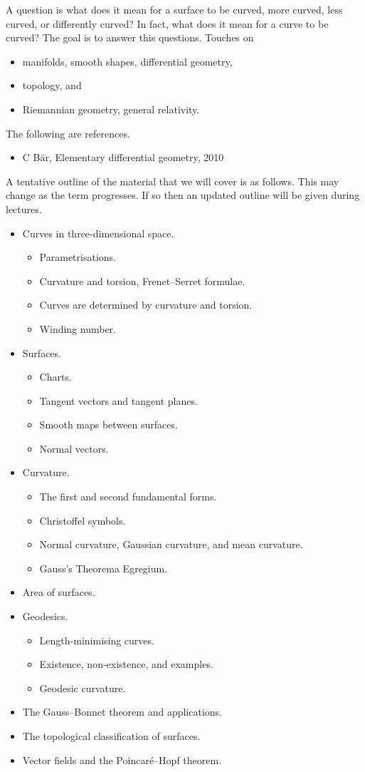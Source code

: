 A question is what does it mean for a surface to be curved, more curved, less curved, or differently curved? In fact, what does it mean for a curve to be curved? The goal is to answer this questions. Touches on
\begin{itemize}
\item manifolds, smooth shapes, differential geometry,
\item topology, and
\item Riemannian geometry, general relativity.
\end{itemize}
The following are references.
\begin{itemize}
\item C B\"ar, Elementary differential geometry, 2010
\end{itemize}
A tentative outline of the material that we will cover is as follows. This may change as the term progresses. If so then an updated outline will be given during lectures.
\begin{itemize}
\item Curves in three-dimensional space.
\begin{itemize}
\item Parametrisations.
\item Curvature and torsion, Frenet–Serret formulae.
\item Curves are determined by curvature and torsion.
\item Winding number.
\end{itemize}
\item Surfaces.
\begin{itemize}
\item Charts.
\item Tangent vectors and tangent planes.
\item Smooth maps between surfaces.
\item Normal vectors.
\end{itemize}
\item Curvature.
\begin{itemize}
\item The first and second fundamental forms.
\item Christoffel symbols.
\item Normal curvature, Gaussian curvature, and mean curvature.
\item Gauss's Theorema Egregium.
\end{itemize}
\item Area of surfaces.
\item Geodesics.
\begin{itemize}
\item Length-minimising curves.
\item Existence, non-existence, and examples.
\item Geodesic curvature.
\end{itemize}
\item The Gauss–Bonnet theorem and applications.
\item The topological classification of surfaces.
\item Vector fields and the Poincar\'e–Hopf theorem.
\end{itemize}

